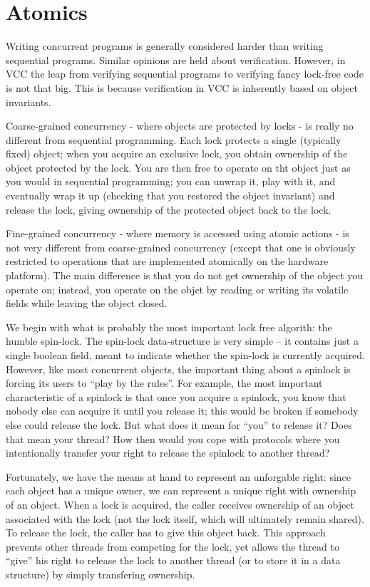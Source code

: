 \section{Atomics}
\label{sect:concurrency}

Writing concurrent programs is generally considered harder than
writing sequential programs.  Similar opinions are held about
verification.  However, in VCC the leap from verifying sequential
programs to verifying fancy lock-free code is not that big.  This is
because verification in VCC is inherently based on object invariants.

Coarse-grained concurrency - where objects are protected by locks - is
really no different from sequential programming. Each lock protects a
single (typically fixed) object; when you acquire an exclusive lock,
you obtain ownership of the object protected by the lock. You are then
free to operate on tht object just as you would in sequential
programming; you can unwrap it, play with it, and eventually wrap it
up (checking that you restored the object invariant) and release the
lock, giving ownership of the protected object back to the lock.

Fine-grained concurrency - where memory is accessed using atomic
actions - is not very different from coarse-grained concurrency
(except that one is obviously restricted to operations that are
implemented atomically on the hardware platform). The
main difference is that you do not get ownership of the object you
operate on; instead, you operate on the objct by reading or writing
its volatile fields while leaving the object closed.

We begin with what is probably the most important lock free algorith:
the humble spin-lock.  The spin-lock data-structure is very simple --
it contains just a single boolean field, meant to indicate whether the
spin-lock is currently acquired. However, like most concurrent
objects, the important thing about a spinlock is forcing its users to
``play by the rules''. For example, the most important
characteristic of a spinlock is that once you acquire a spinlock, you
know that nobody else can acquire it until you release it; this would
be broken if somebody else could release the lock. But what does it
mean for ``you'' to release it? Does that mean your thread? How then
would you cope with protocols where you intentionally transfer your
right to release the spinlock to another thread?

Fortunately, we have the means at hand to represent an unforgable
right: since each object has a unique owner, we can represent a unique
right with ownership of an object. When a lock is acquired, the caller
receives ownership of an object associated with the lock (not the lock
itself, which will ultimately remain shared). To release the lock, the
caller has to give this object back. This approach prevents other
threads from competing for the lock, yet allows the thread to ``give''
his right to release the lock to another thread (or to store it in a
data structure) by simply transfering ownership.

